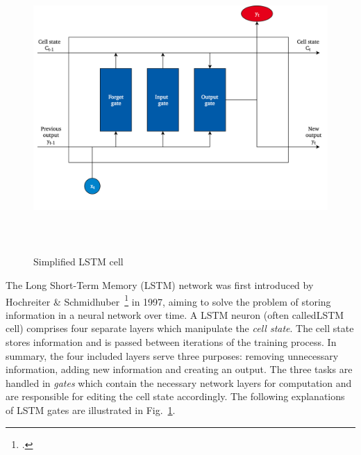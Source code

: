 \begin{figure}[h]
  \includegraphics[height=11cm]{img/lstm_cell}
  \caption{Simplified LSTM cell}
\label{fig:lstm_cell}
\end{figure}

The Long Short-Term Memory (LSTM) network was first introduced by Hochreiter \&
Schmidhuber~\footcite{Hochreiter1997} in 1997, aiming to solve the problem of
storing information in a neural network over time.
A LSTM neuron (often calledLSTM cell) comprises four separate layers which 
manipulate the \textit{cell state}.
The cell state stores information and is passed between iterations of the
training process.
In summary, the four included layers serve three purposes: removing unnecessary
information, adding new information and creating an output.
The three tasks are handled in \textit{gates} which contain the necessary
network layers for computation and are responsible for editing the cell state
accordingly.
The following explanations of LSTM gates are illustrated in Fig.~\ref{fig:lstm_cell}.

